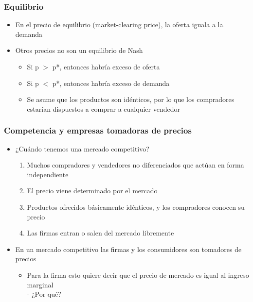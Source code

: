 \documentclass{beamer}
\begin{document}
\begin{frame}
\frametitle{Equilibrio}
\begin{itemize}
    \item En el precio de equilibrio (market-clearing price), la oferta iguala a la demanda
    \item Otros precios no son un equilibrio de Nash
    \begin{itemize}
        \item Si p $>$ p*, entonces habría exceso de oferta \\
        \item Si p $<$ p*, entonces habría exceso de demanda \\
        \item Se asume que los productos son idénticos, por lo que los compradores estarían dispuestos a comprar a cualquier vendedor
    \end{itemize}
\end{itemize}
\end{frame}

\begin{frame}
\frametitle{Competencia y empresas tomadoras de precios}
\begin{itemize}
    \item ¿Cuándo tenemos una mercado competitivo?
    \begin{enumerate}
        \item Muchos compradores y vendedores no diferenciados que actúan en forma independiente
        \item El precio viene determinado por el mercado
        \item Productos ofrecidos básicamente idénticos, y los compradores conocen su precio
        \item Las firmas entran o salen del mercado libremente 
    \end{enumerate}
    \vspace{2mm}
    \item En un mercado competitivo las firmas y los consumidores son tomadores de precios
    \begin{itemize}
        \item Para la firma esto quiere decir que el precio de mercado es igual al ingreso marginal \\
        - ¿Por qué?
    \end{itemize}
\end{itemize}
\end{frame}
\end{document}
